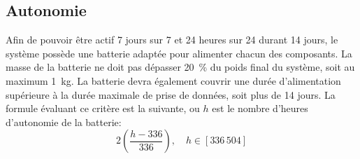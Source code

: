 

\subsection{Autonomie}
\label{s:cdc_aut_autnmi}

Afin de pouvoir être actif 7 jours sur 7 et 24 heures sur 24 durant 14 jours, le système possède une batterie adaptée pour alimenter chacun des composants.
La masse de la batterie ne doit pas dépasser 20~\% du poids final du système, soit au maximum 1~kg.
La batterie devra également couvrir une durée d’alimentation supérieure à la durée maximale de prise de données, soit plus de 14 jours.
\wl
La formule évaluant ce critère est la suivante, ou $h$ est le nombre d’heures d’autonomie de la batterie:
\begin{equation} \label{eq:cdc_aut_autnmi}
	2\left(\frac{h-336}{336}\right),\quad h \in [336\,504]
\end{equation}